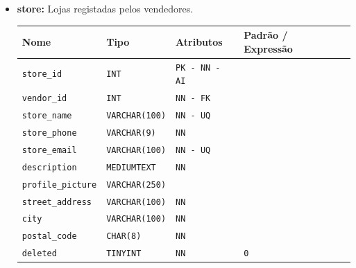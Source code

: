 \begin{itemize}
    \item \textbf{store:}
    Lojas registadas pelos vendedores. 
    \begin{table}[H]
        \centering
        \begin{tabularx}{\linewidth}{XXXXX}
        \toprule
        \textbf{\color{color_scheme}Nome} & \textbf{\color{color_scheme}Tipo} & \textbf{\color{color_scheme}Atributos} & \textbf{\color{color_scheme}Padrão / Expressão}\\
        \midrule
        \texttt{store\_id} & \texttt{INT} & \texttt{PK - NN - AI} &\\
        \texttt{vendor\_id} & \texttt{INT} & \texttt{NN - FK} & \\
        \texttt{store\_name} & \texttt{VARCHAR(100)}  & \texttt{NN - UQ} & \\
        \texttt{store\_phone} & \texttt{VARCHAR(9)}  & \texttt{NN} & \\
        \texttt{store\_email} & \texttt{VARCHAR(100)}  & \texttt{NN - UQ} & \\
        \texttt{description} & \texttt{MEDIUMTEXT}  & \texttt{NN} & \\
        \texttt{profile\_picture} & \texttt{VARCHAR(250)} &  & \\
        \texttt{street\_address} & \texttt{VARCHAR(100)} & \texttt{NN} & \\
        \texttt{city} & \texttt{VARCHAR(100)} & \texttt{NN} & \\
        \texttt{postal\_code} & \texttt{CHAR(8)} & \texttt{NN} & \\
        \texttt{deleted} & \texttt{TINYINT}  & \texttt{NN}  & \texttt{0} \\
        \bottomrule
        \end{tabularx}
        \label{table: store}
    \end{table}


\end{itemize}
